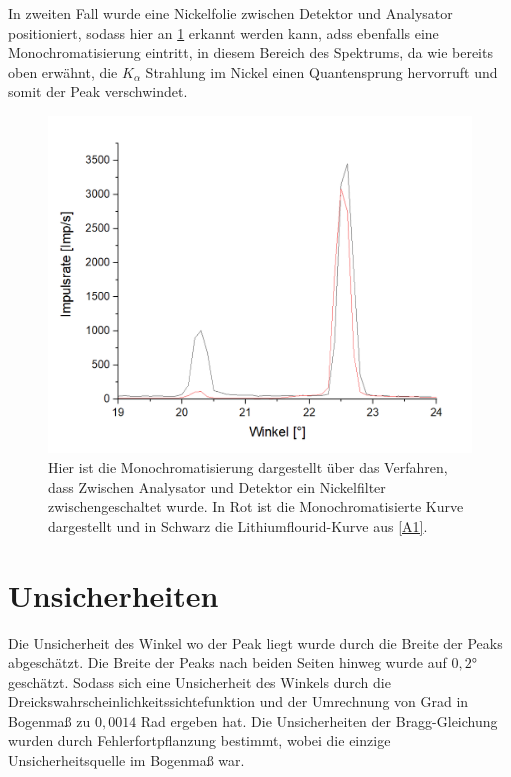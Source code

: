 \documentclass[
	a4paper,
	12pt,
	pagesize,
	ngerman
]{scrartcl}
\begin{document}
In zweiten Fall wurde eine Nickelfolie zwischen Detektor und Analysator positioniert, sodass hier an \cref{A7} erkannt werden kann, adss ebenfalls eine Monochromatisierung eintritt, in diesem Bereich des Spektrums, da wie bereits oben erwähnt, die $K_{\alpha}$ Strahlung im Nickel einen Quantensprung hervorruft und somit der Peak verschwindet.
\begin{figure}[h!]
    \centering
    \includegraphics[scale = 0.6]{abs-mono.png}
    \caption{Hier ist die Monochromatisierung dargestellt über das Verfahren, dass Zwischen Analysator und Detektor ein Nickelfilter zwischengeschaltet wurde. In Rot ist die Monochromatisierte Kurve dargestellt und in Schwarz die Lithiumflourid-Kurve aus \cref{A1}.}
    \label{A7}
\end{figure}
\section{Unsicherheiten}
Die Unsicherheit des Winkel wo der Peak liegt wurde durch die Breite der Peaks abgeschätzt. Die Breite der Peaks nach beiden Seiten hinweg wurde auf $0,2$° geschätzt. Sodass sich eine Unsicherheit des Winkels durch die Dreickswahrscheinlichkeitssichtefunktion und der Umrechnung von Grad in Bogenmaß zu $0,0014$ Rad ergeben hat.
Die Unsicherheiten der Bragg-Gleichung wurden durch Fehlerfortpflanzung bestimmt, wobei die einzige Unsicherheitsquelle im Bogenmaß war.
\end{document}
